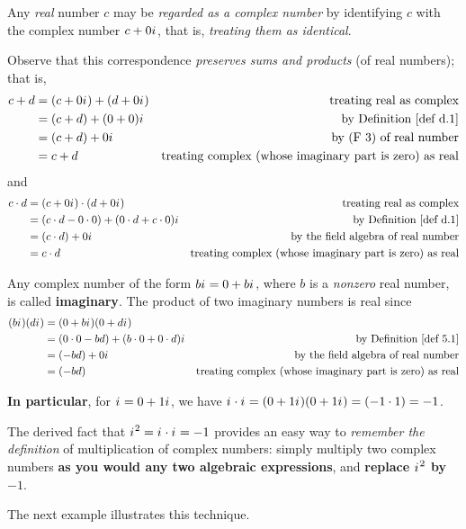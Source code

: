 \begin{remark} \label{remark d.1}
Any \emph{real} number \(c\) may be \emph{regarded as a complex number} by identifying \(c\) with the complex number \(c + 0{i\mkern1mu}\),
that is, \emph{treating them as identical}.

Observe that this correspondence \emph{preserves sums and products} (of real numbers); that is,
\begin{align*}
    c + d & = (c + 0\iu) + (d + 0\iu) & \text{treating real as complex} \\
        & = (c + d) + (0 + 0)\iu & \text{by \DEF{d.1}} \\
        & = (c + d) + 0\iu & \text{by (F 3) of real number} \\
        & = c + d & \text{treating complex (whose imaginary part is zero) as real}
\end{align*}
and
\begin{align*}
    c \cdot d & = (c + 0\iu) \cdot (d + 0\iu) & \text{treating real as complex} \\
        & = (c \cdot d - 0 \cdot 0) + (0 \cdot d + c \cdot 0)\iu & \text{by \DEF{d.1}} \\
        & = (c \cdot d) + 0\iu & \text{by the field algebra of real number} \\
        & = c \cdot d & \text{treating complex (whose imaginary part is zero) as real}
\end{align*}
\end{remark}

\begin{remark} \label{remark d.2}
Any complex number of the form \(b {i\mkern1mu} = 0 + b {i\mkern1mu}\), where \(b\) is a \emph{nonzero} real number, is called \textbf{imaginary}.
The product of two imaginary numbers is real since
\begin{align*}
    (b\iu)(d\iu) & = (0 + b\iu)(0 + d\iu) \\
        & = (0 \cdot 0 - bd) + (b \cdot 0 + 0 \cdot d)\iu & \text{by \DEF{5.1}} \\
        & = (-bd) + 0\iu & \text{by the field algebra of real number} \\
        & = (-bd) & \text{treating complex (whose imaginary part is zero) as real}
\end{align*}

\textbf{In particular}, for \({i\mkern1mu} = 0 + 1{i\mkern1mu}\), we have \({i\mkern1mu} \cdot {i\mkern1mu} = (0 + 1{i\mkern1mu})(0 + 1{i\mkern1mu}) = (-1 \cdot 1) = -1\).

The derived fact that \({i\mkern1mu}^2 = {i\mkern1mu} \cdot {i\mkern1mu} = -1\) provides an easy way to \emph{remember the definition} of multiplication of complex numbers:
simply multiply two complex numbers \textbf{as you would any two algebraic expressions}, and \textbf{replace \({i\mkern1mu}^2\) by \(-1\)}.

The next example illustrates this technique.
\end{remark}


